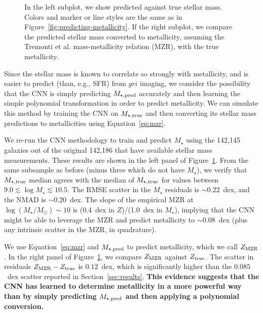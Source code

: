 \documentclass[fleqn,usenatbib]{mnras}
\begin{document}
\begin{figure}
	\caption{\label{fig:mass-metallicity}
		In the left subplot, we show predicted against true stellar mass.
		Colors and marker or line styles are the same as in Figure~\ref{fig:predicting-metallicity}.
		If the right subplot, we compare the predicted stellar mass converted to metallicity, assuming the Tremonti et al. mass-metallicity relation (MZR), with the true metallicity.}
\end{figure}

Since the stellar mass is known to correlate so strongly with metallicity, and is easier to predict (than, e.g., SFR) from $gri$ imaging, we consider the possibility that the CNN is simply predicting $M_{\star,\rm pred}$ accurately and then learning the simple polynomial transformation in order to predict metallicity.
We can simulate this method by training the CNN on $M_{\star, \rm true}$ and then converting its stellar mass predictions to metallicities using Equation~\ref{eq:mzr}.


We re-run the CNN methodology to train and predict $M_{\star}$ using the 142,145 galaxies out of the original 142,186 that have available stellar mass measurements.
These results are shown in the left panel of Figure~\ref{fig:mass-metallicity}.
From the same subsample as before (minus three which do not have $M_{\star}$), we verify that $M_{\rm \star, true}$ median agrees with the median of $M_{\rm \star, true}$ for values between $9.0 \lesssim \log M_\star \lesssim 10.5$.
The RMSE scatter in the $M_{\star}$ residuals is $\sim 0.22$~dex, and the NMAD is $\sim 0.20$~dex.
The slope of the empirical MZR at $\log (M_\star / M_\odot) \sim 10$ is (0.4~dex in $Z$)/(1.0~dex in $M_{\star}$), implying that the CNN might be able to leverage the MZR and predict metallicity to $\sim 0.08$~dex (plus any intrinsic scatter in the MZR, in quadrature).

We use Equation~\ref{eq:mzr} and $M_{\star,\rm pred}$ to predict metallicity, which we call $Z_{\rm MZR}$.
In the right panel of Figure~\ref{fig:mass-metallicity}, we compare $Z_{\rm MZR}$ against $Z_{\rm true}$.
The scatter in residuals $Z_{\rm MZR} - Z_{\rm true}$ is $0.12$~dex, which is significantly higher than the $0.085$~dex scatter reported in Section~\ref{sec:results}.
\textbf{This evidence suggests that the CNN has learned to determine metallicity in a more powerful way than by simply predicting $M_{\rm \star,pred}$ and then applying a polynomial conversion.}
\end{document}
